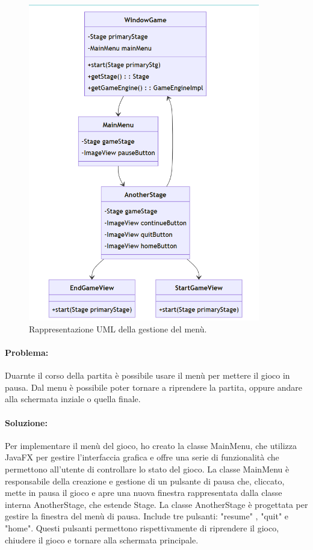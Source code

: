\documentclass[a4paper,12pt]{report}
\begin{document}
\begin{figure}[H]
\centering{}
\includegraphics[width=0.9\textwidth]{img/mainmenu.png}
\caption{Rappresentazione UML della gestione del menù.}
\end{figure}

\paragraph{Problema:}
Duarnte il corso della partita è possibile usare il menù per mettere il gioco in pausa. 
Dal menu è possibile poter tornare a riprendere la partita, oppure andare alla schermata inziale o quella finale.

\paragraph{Soluzione:}
Per implementare il menù del gioco, ho creato la classe MainMenu, che utilizza JavaFX per gestire l'interfaccia grafica e offre una serie di funzionalità che permettono all'utente di controllare lo stato del gioco. 
La classe MainMenu è responsabile della creazione e gestione di un pulsante di pausa che, cliccato, mette in pausa il gioco e apre una nuova finestra rappresentata dalla classe interna AnotherStage, che estende Stage. 
La classe AnotherStage è progettata per gestire la finestra del menù di pausa. 
Include tre pulsanti: "resume" , "quit" e "home". 
Questi pulsanti permettono rispettivamente di riprendere il gioco, chiudere il gioco e tornare alla schermata principale. 
\end{document}

